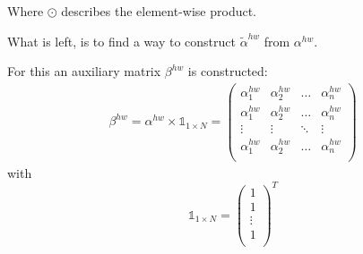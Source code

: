 Where $\odot$ describes the element-wise product.

What is left, is to find a way to construct $\tilde{\alpha}^{hw}$ from $\alpha^{hw}$.

For this an auxiliary matrix $\beta^{hw}$ is constructed:
\begin{align}
    \beta^{hw} = \alpha^{hw} \times \mathbb{1}_{1 \times N} = 
    \begin{pmatrix}
        \alpha^{hw}_1 & \alpha^{hw}_2 & \hdots & \alpha^{hw}_n\\
        \alpha^{hw}_1 & \alpha^{hw}_2 & \hdots & \alpha^{hw}_n\\
        \vdots & \vdots & \ddots & \vdots \\
        \alpha^{hw}_1 & \alpha^{hw}_2 & \hdots & \alpha^{hw}_n\\
    \end{pmatrix}
\end{align}
with
$$
\mathbb{1}_{1 \times N} = \begin{pmatrix}
        1 \\
        1 \\
        \vdots\\
        1 \\
    \end{pmatrix}^T
$$


